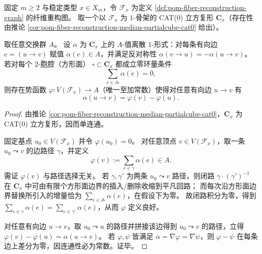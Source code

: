\begin{theorem}\label{thm:pom-fiber-cubical-poincare-stokes-lemma}
固定 \(m\ge 2\) 与稳定类型 \(x\in X_m\)，令 \(\mathcal F_x\) 为定义 \ref{def:pom-fiber-reconstruction-graph} 的纤维重构图。
取一个以 \(\mathcal F_x\) 为 \(1\)-骨架的 CAT(0) 立方复形 \(\mathbf C_x\)（存在性由推论 \ref{cor:pom-fiber-reconstruction-median-partialcube-cat0} 给出）。
\par
取任意交换群 \(A\)。
设 \(\alpha\) 为 \(\mathbf C_x\) 上的 \(A\)-值离散 \(1\)-形式：对每条有向边 \(e=(u\to v)\) 赋值 \(\alpha(e)\in A\)，并满足反对称性 \(\alpha(v\to u)=-\alpha(u\to v)\)。
若对每个 \(2\)-胞腔（方形面） \(\square\subset \mathbf C_x\) 都成立零环量条件
\[
\sum_{e\in\partial\square}\alpha(e)=0,
\]
则存在势函数 \(\varphi:V(\mathcal F_x)\to A\)（唯一至加常数）使得对任意有向边 \(u\to v\) 有
\[
\boxed{\;\alpha(u\to v)=\varphi(v)-\varphi(u).\;}
\]
\end{theorem}
\begin{proof}
由推论 \ref{cor:pom-fiber-reconstruction-median-partialcube-cat0}，\(\mathbf C_x\) 为 CAT(0) 立方复形，因而单连通。
\par
固定基点 \(u_0\in V(\mathcal F_x)\) 并令 \(\varphi(u_0)=0\)。
对任意顶点 \(v\in V(\mathcal F_x)\)，取一条 \(u_0\leadsto v\) 的边路径 \(\gamma\)，并定义
\[
\varphi(v):=\sum_{e\in\gamma}\alpha(e)\in A.
\]
需证 \(\varphi(v)\) 与路径选择无关。
若 \(\gamma,\gamma'\) 为两条 \(u_0\leadsto v\) 路径，则闭路 \(\gamma\cdot(\gamma')^{-1}\) 在 \(\mathbf C_x\) 中可由有限个方形面边界的插入/删除收缩到平凡回路；
而每次沿方形面边界替换所引入的增量恰为 \(\sum_{e\in\partial\square}\alpha(e)\)，在假设下为零。
故闭路积分为零，得到 \(\sum_{e\in\gamma}\alpha(e)=\sum_{e\in\gamma'}\alpha(e)\)，从而 \(\varphi\) 定义良好。
\par
对任意有向边 \(u\to v\)，取 \(u_0\leadsto u\) 的路径并拼接该边得到 \(u_0\leadsto v\) 的路径，立得
\(\varphi(v)-\varphi(u)=\alpha(u\to v)\)。
若 \(\varphi,\psi\) 皆满足 \(\alpha=\nabla\varphi=\nabla\psi\)，则 \(\varphi-\psi\) 在每条边上差分为零，因连通性必为常数。证毕。
\end{proof}
